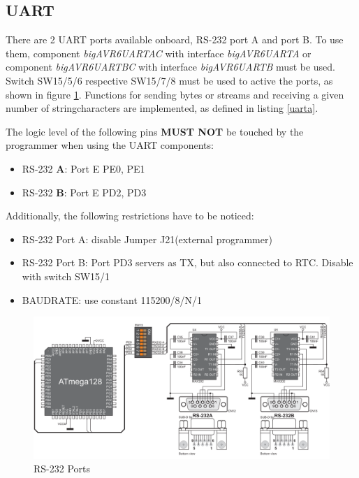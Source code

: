 \subsection{UART}

There are 2 UART ports available onboard, RS-232 port A and port B. To use them, component \textit{bigAVR6UARTAC} with interface \textit{bigAVR6UARTA} or component \textit{bigAVR6UARTBC} with interface \textit{bigAVR6UARTB} must be used. Switch SW15/5/6 respective SW15/7/8 must be used to active the ports, as shown in figure \ref{fig:uart}. Functions for sending bytes or streams and receiving a given number of stringcharacters are implemented, as defined in listing \ref{uarta}.



The logic level of the following pins \textbf{MUST NOT} be touched by the programmer when using the UART components:

\begin{itemize}
 \item RS-232 \textbf{A}: Port E PE0, PE1
 \item RS-232 \textbf{B}: Port E PD2, PD3
\end{itemize}

Additionally, the following restrictions have to be noticed:

\begin{itemize}
 \item RS-232 Port A: disable Jumper J21(external programmer)
 \item RS-232 Port B: Port PD3 servers as TX, but also connected to RTC. Disable with switch SW15/1
 \item BAUDRATE: use constant 115200/8/N/1
\end{itemize}

\begin{figure}[h]
 \centerline{\includegraphics[width=1.0\columnwidth]{pics/UART.png}}
  \caption{RS-232 Ports}
  \label{fig:uart}
\end{figure}

